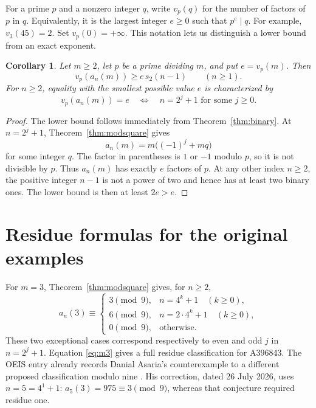 \documentclass[11pt,a4paper]{article}
\newtheorem{corollary}[theorem]{Corollary}
\theoremstyle{remark}
\begin{document}
For a prime $p$ and a nonzero integer $q$, write $v_p(q)$ for the number
of factors of $p$ in $q$. Equivalently, it is the largest integer $e\ge0$
such that $p^e\mid q$. For example, $v_3(45)=2$. Set $v_p(0)=+\infty$.
This notation lets us distinguish a lower bound from an exact exponent.

\begin{corollary}\label{cor:valuation}
Let $m\ge2$, let $p$ be a prime dividing $m$, and put $e=v_p(m)$. Then
\[
 v_p(a_n(m))\ge e\,s_2(n-1)\qquad(n\ge1).
\]
For $n\ge2$, equality with the smallest possible value $e$ is characterized by
\begin{equation}\label{eq:minval}
 v_p(a_n(m))=e
 \quad\Longleftrightarrow\quad
 n=2^j+1\text{ for some }j\ge0.
\end{equation}
\end{corollary}

\begin{proof}
The lower bound follows immediately from Theorem~\ref{thm:binary}.
At $n=2^j+1$, Theorem~\ref{thm:modsquare} gives
\[
 a_n(m)=m\bigl((-1)^j+mq\bigr)
\]
for some integer $q$. The factor in parentheses is $1$ or $-1$ modulo $p$,
so it is not divisible by $p$. Thus $a_n(m)$ has exactly $e$ factors of $p$.
At any other index $n\ge2$, the positive integer $n-1$ is not a power
of two and hence has at least two binary ones. The lower bound is then
at least $2e>e$.
\end{proof}

\section{Residue formulas for the original examples}

For $m=3$, Theorem~\ref{thm:modsquare} gives, for $n\ge2$,
\begin{equation}\label{eq:m3}
 a_n(3)\equiv
 \begin{cases}
 3\pmod9,&n=4^k+1\quad(k\ge0),\\
 6\pmod9,&n=2\cdot4^k+1\quad(k\ge0),\\
 0\pmod9,&\text{otherwise}.
 \end{cases}
\end{equation}
These two exceptional cases correspond respectively to even and odd $j$
in $n=2^j+1$. Equation \eqref{eq:m3} gives a full residue classification
for A396843. The OEIS entry already records Danial Asaria's counterexample
to a different proposed classification modulo nine \cite{oeis3}.
His correction, dated 26 July 2026, uses $n=5=4^1+1$:
$a_5(3)=975\equiv3\pmod9$, whereas that conjecture required residue one.
\end{document}
